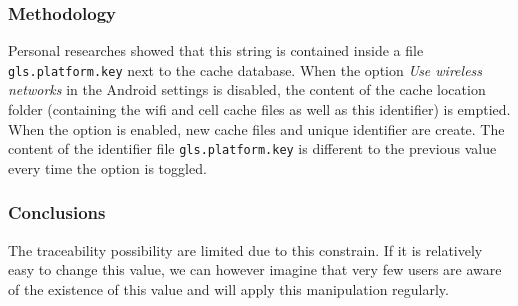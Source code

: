 \subsubsection{Methodology}

Personal researches showed that this string is contained inside a file \texttt{gls.platform.key} next to the cache database.
When the option \emph{Use wireless networks} in the Android settings is disabled, the content of the cache location folder (containing the wifi and cell cache files as well as this identifier) is emptied.
When the option is enabled, new cache files and unique identifier are create.
The content of the identifier file \texttt{gls.platform.key} is different to the previous value every time the option is toggled.

\subsubsection{Conclusions}

The traceability possibility are limited due to this constrain.
If it is relatively easy to change this value, we can however imagine that very few users are aware of the existence of this value and will apply this manipulation regularly.





